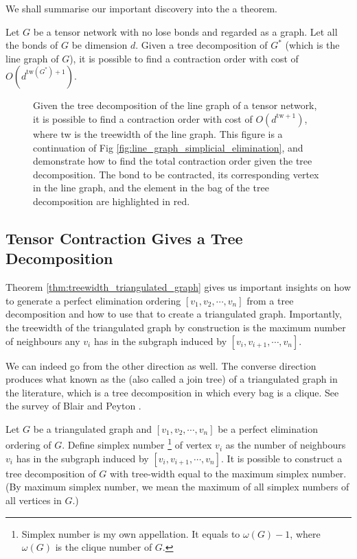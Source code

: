 We shall summarise our important discovery into the a theorem.

\begin{lemma}\label{lem:treewidth_contraction_order}
	Let $G$ be a tensor network with no lose bonds and regarded as a graph. 
	Let all the bonds of $G$ be dimension $d$.
	Given a tree decomposition of $G^*$ (which is the line graph of $G$), it is possible to find a contraction order with cost of $O(d^{\text{tw}(G^*) + 1})$.
\end{lemma}

\begin{figure}[ht]
	\centering
	\resizebox{0.9\textwidth}{!}{
		
	}
	\caption{Given the tree decomposition of the line graph of a tensor network, it is possible to find a contraction order with cost of $O(d^{\text{tw} + 1})$, where tw is the treewidth of the line graph.
		This figure is a continuation of Fig \ref{fig:line_graph_simplicial_elimination}, and demonstrate how to find the total contraction order given the tree decomposition.
	The bond to be contracted, its corresponding vertex in the line graph, and the element in the bag of the tree decomposition are highlighted in red.}
	\label{fig:contraction_order_from_tree_decomposition}
\end{figure}

\subsection{Tensor Contraction Gives a Tree Decomposition}

Theorem \ref{thm:treewidth_triangulated_graph} gives us important insights on how to generate a perfect elimination ordering $[v_1, v_2, \cdots, v_n]$ from a tree decomposition and how to use that to create a triangulated graph. 
Importantly, the treewidth of the triangulated graph by construction is the maximum number of neighbours any $v_i$ has in the subgraph induced by $[v_i, v_{i+1}, \cdots, v_n]$.

We can indeed go from the other direction as well.
The converse direction produces what known as the  (also called a join tree) of a triangulated graph in the literature, which is a tree decomposition in which every bag is a clique. 
See the survey of Blair and Peyton \cite{blair1993chordal}. 

\begin{theorem}\label{thm:tree_decomposition_from_perfect_elimination_ordering}
	Let $G$ be a triangulated graph and $[v_1, v_2, \cdots, v_n]$ be a perfect elimination ordering of $G$. 
	Define simplex number 
	\footnote{Simplex number is my own appellation. It equals to $\omega(G) -1$, where $\omega(G)$ is the clique number of $G$.}
	of vertex $v_i$ as the number of neighbours $v_i$ has in the subgraph induced by $[v_i, v_{i+1}, \cdots, v_n]$.
	It is possible to construct a tree decomposition of $G$ with tree-width equal to the maximum simplex number. (By maximum simplex number, we mean the maximum of all simplex numbers of all vertices in $G$.)
\end{theorem}

